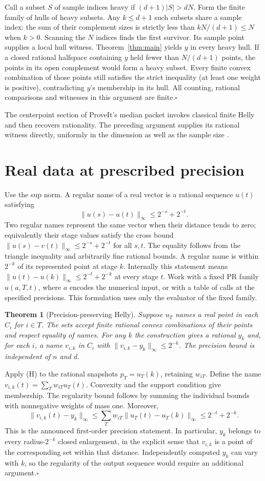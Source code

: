 \documentclass[11pt,letterpaper]{article}
\newcommand{\Norm}[1]{\lVert #1\rVert_\infty}
\theoremstyle{packet}\newtheorem{theorem}{Theorem}\newtheorem{lem}[theorem]{Lemma}
\newcommand{\head}[1]{\section{#1}}
\begin{document}
Call a subset $S$ of sample indices heavy if $(d+1)|S|>dN$. Form the finite family of hulls of heavy subsets. Any $k\le d+1$ such subsets share a sample index: the sum of their complement sizes is strictly less than $kN/(d+1)\le N$ when $k>0$. Scanning the $N$ indices finds the first survivor. Its sample point supplies a local hull witness. Theorem~\ref{thm:main} yields $y$ in every heavy hull. If a closed rational halfspace containing $y$ held fewer than $N/(d+1)$ points, the points in its open complement would form a heavy subset. Every finite convex combination of those points still satisfies the strict inequality (at least one weight is positive), contradicting $y$'s membership in its hull. All counting, rational comparisons and witnesses in this argument are finite.\hfill$\square$

The centerpoint section of ProveIt's median packet invokes classical finite Helly and then recovers rationality. The preceding argument supplies its rational witness directly, uniformly in the dimension as well as the sample size \cite{median}.

\newpage
\head{Real data at prescribed precision}\label{sec:real}

Use the sup norm. A regular name of a real vector is a rational sequence $u(t)$ satisfying
\[
       \Norm{u(s)-u(t)}\le 2^{-s}+2^{-t} .
\]
Two regular names represent the same vector when their distance tends to zero; equivalently their stage values satisfy the cross bound $\Norm{u(s)-v(t)}\le 2^{-s}+2^{-t}$ for all $s,t$. The equality follows from the triangle inequality and arbitrarily fine rational bounds. A regular name is within $2^{-k}$ of its represented point at stage $k$. Internally this statement means $\Norm{u(t)-u(k)}\le2^{-t}+2^{-k}$ at every stage $t$. Work with a fixed PR family $u(a,T,t)$, where $a$ encodes the numerical input, or with a table of calls at the specified precisions. This formulation uses only the evaluator of the fixed family.

\begin{theorem}[Precision-preserving Helly]\label{thm:approx}
Suppose $u_T$ names a real point in each $C_i$ for $i\in T$. The sets accept finite rational convex combinations of their points and respect equality of names. For any $k$ the construction gives a rational $y_k$ and, for each $i$, a name $v_{i,k}$ in $C_i$ with $\Norm{v_{i,k}-y_k}\le 2^{-k}$. The precision bound is independent of $n$ and $d$.
\end{theorem}

Apply (H) to the rational snapshots $p_T=u_T(k)$, retaining $w_{iT}$. Define the name $v_{i,k}(t)=\sum_Tw_{iT}u_T(t)$. Convexity and the support condition give membership. The regularity bound follows by summing the individual bounds with nonnegative weights of mass one. Moreover,
\[
 \Norm{v_{i,k}(t)-y_k}
 \le\sum_Tw_{iT}\Norm{u_T(t)-u_T(k)}\le 2^{-t}+2^{-k}.
\]
This is the announced first-order precision statement. In particular, $y_k$ belongs to every radius-$2^{-k}$ closed enlargement, in the explicit sense that $v_{i,k}$ is a point of the corresponding set within that distance. Independently computed $y_k$ can vary with $k$, so the regularity of the output sequence would require an additional argument.\hfill$\square$
\end{document}
